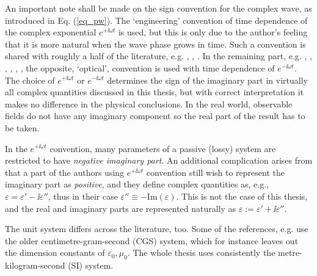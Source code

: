 An important note shall be made on the sign convention for the complex wave, as introduced in Eq. (\ref{eq_pw}).
The `engineering' convention of time dependence of the complex exponential $e^{+\ii \omega t}$ is used, but this is only due to the author's feeling that it is more natural when the wave phase grows in time. Such a convention is shared with roughly a half of the literature, e.g. \cite[p. 9]{engheta2006book}, \cite[pp. 21 and 99]{krowne2007book}, \cite[Chapters 1-4, 6, 9 and 10]{eleftheriades2005book}.  In the remaining part, e.g. \cite[chapters 5, 7, 8]{eleftheriades2005book}, \cite{klingshirn2007semiconductor}, \cite{jackson1962book}, \cite{veselago1968}, \cite{born1999book}, \cite[p. 5]{noginov2011book}, the opposite, `optical', convention is used with time dependence of $e^{-\ii \omega t}$. The choice of $e^{+\ii\omega t}$ or $e^{-\ii\omega t}$ determines the sign of the imaginary part in virtually all complex quantities discussed in this thesis, but with correct interpretation it makes no difference in the physical conclusions.
In the real world, observable fields do not have any imaginary component so the real part of the result has to be taken. 

In the $e^{+\ii\omega t}$ convention, many parameters of a passive (lossy) system are restricted to have \textit{negative imaginary part}. An additional complication arises from that a part of the authors using $e^{+\ii\omega t}$ convention still wish to represent the imaginary part as \textit{positive}, and they define complex quantities as, e.g., $\varepsilon = \varepsilon' - \ii \varepsilon''$, %
thus in their case $\varepsilon''\equiv -\text{Im}(\varepsilon)$. This is not the case of this thesis, and the real and imaginary parts are represented naturally as $\varepsilon := \varepsilon' + \ii \varepsilon''$.

The unit system differs across the literature, too. Some of the references, e.g. \cite{landau1984electrodynamics, agranovich2006spatial, krowne2007book_agran} use the older centimetre-gram-second (CGS) system, which for instance leaves out the dimension constants of $\varepsilon_0, \mu_0$. The whole thesis uses consistently the metre-kilogram-second (SI) system.

